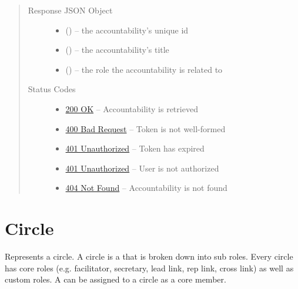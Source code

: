 \documentclass[letterpaper,10pt,english]{sphinxmanual}
\begin{document}
\begin{fulllineitems}
\begin{quote}
\begin{description}
\begin{itemize}
\end{itemize}

\item[{Response JSON Object}] \leavevmode\begin{itemize}
\item {} 
 () -- the accountability's unique id

\item {} 
 () -- the accountability's title

\item {} 
 () -- the role the accountability is related to

\end{itemize}

\item[{Status Codes}] \leavevmode\begin{itemize}
\item {} 
\href{http://www.w3.org/Protocols/rfc2616/rfc2616-sec10.html\#sec10.2.1}{200 OK} -- Accountability is retrieved

\item {} 
\href{http://www.w3.org/Protocols/rfc2616/rfc2616-sec10.html\#sec10.4.1}{400 Bad Request} -- Token is not well-formed

\item {} 
\href{http://www.w3.org/Protocols/rfc2616/rfc2616-sec10.html\#sec10.4.2}{401 Unauthorized} -- Token has expired

\item {} 
\href{http://www.w3.org/Protocols/rfc2616/rfc2616-sec10.html\#sec10.4.2}{401 Unauthorized} -- User is not authorized

\item {} 
\href{http://www.w3.org/Protocols/rfc2616/rfc2616-sec10.html\#sec10.4.5}{404 Not Found} -- Accountability is not found

\end{itemize}

\end{description}\end{quote}

\end{fulllineitems}



\section{Circle}
\label{\detokenize{resources/circle:circle}}\label{\detokenize{resources/circle::doc}}\label{\detokenize{resources/circle:id1}}
Represents a circle. A circle is a {\hyperref[\detokenize{resources/role:role}]{}} that is broken down into sub roles. Every circle has core roles (e.g. facilitator, secretary, lead link, rep link, cross link) as well as custom roles. A {\hyperref[\detokenize{resources/partner:partner}]{}} can be assigned to a circle as a core member.
\end{document}
